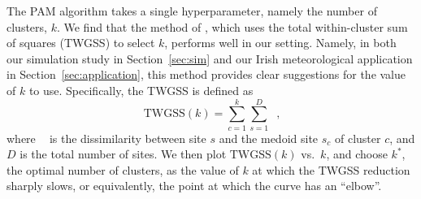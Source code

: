 \documentclass[
  12pt]{article}
\newcommand{\JSGa}{\mathop{\mathrm{JS}^{\mathrm{G}_{\lambda}}}\nolimits}
\newcommand{\eJSGa}[1]{\mathop{\mathrm{eJS}_{i, #1}^{\mathrm{G}_{\lambda}}}\nolimits}
\begin{document}
The PAM algorithm takes a single hyperparameter, namely the number of clusters, $k$.
We find that the method of \citet{Thorndike1953-ie}, which uses the total within-cluster sum of squares (TWGSS) to select $k$, performs well in our setting.
Namely, in both our simulation study in Section~\ref{sec:sim} and our Irish meteorological application in Section~\ref{sec:application}, this method provides clear suggestions for the value of $k$ to use.
Specifically, the TWGSS is defined as
\begin{equation}~\label{eq:twgss}
  \mathrm{TWGSS}(k) = \sum_{c=1}^{k} \sum_{s =1}^{D} \eJSGa{s, s_c},
\end{equation}
where $\eJSGa{s, s_c}$ is the dissimilarity between site $s$ and the medoid site $s_c$ of cluster $c$, and $D$ is the total number of sites. 
We then plot $\mathrm{TWGSS}(k)$ vs.\ $k$, and choose $k^*$, the optimal number of clusters, as the value of $k$ at which the TWGSS reduction sharply slows, or equivalently, the point at which the curve has an ``elbow''.
\end{document}
